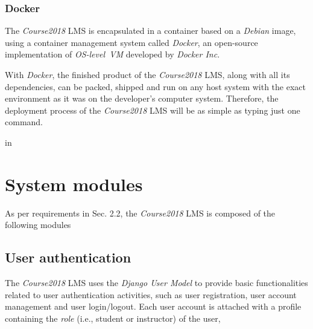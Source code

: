 \subsubsection{Docker}
The \emph{Course2018} LMS is encapsulated in a container based on a
\emph{Debian} image, using a container management system called \emph{Docker},
an open-source implementation of \emph{OS-level~VM} developed by
\emph{Docker Inc}.

\medskip

With \emph{Docker}, the finished product of the
\emph{Course2018} LMS, along with all its dependencies, can be packed, shipped
and run on any host system with the exact environment as it was on the
developer's computer system. Therefore, the deployment process of the
\emph{Course2018} LMS will be as simple as typing just one command.

 in


\section{System modules}

As per requirements in Sec. 2.2, the \emph{Course2018} LMS is composed of the
following modules

\subsection{User authentication}
The \emph{Course2018} LMS uses the \emph{Django User Model} \cite{djangoUser}
to provide
basic functionalities related to user authentication activities, such as
user registration, user account management and user login/logout.
Each user account is attached with a profile containing the \emph{role}
(i.e., student or instructor) of the user, 